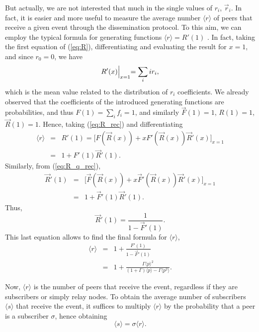 \documentclass[10pt, conference, compsocconf]{IEEEtran}
\begin{document}
But actually, we are not interested that much in the single values of $r_i$, $\overrightarrow{r}_i$. In fact, it is easier and more useful to measure the average number $\langle r \rangle$ of peers that receive a given event through the dissemination protocol. To this aim, we can employ the typical formula for generating functions
$\langle r \rangle = R'(1)$ \cite{Wilf_1994}.
In fact, taking the first equation of (\ref{eq:R}), differentiating and evaluating the result for $x=1$, and since $r_0 = 0$, we have 
$$R'(x) \Bigl\lvert_{x=1} = \sum_i i r_i,$$
which is the mean value related to the distribution of $r_i$ coefficients.
We already observed that the coefficients of the introduced generating functions are probabilities, and thus
$F(1)= \sum_i f_i = 1$, and similarly $\overrightarrow{F}(1)=1$, $R(1)=1$, $\overrightarrow{R}(1)=1$. Hence, taking (\ref{eq:R_rec}) and differentiating 
\begin{eqnarray}\label{eq:r} 
\langle r \rangle & =  & R'(1) = \big[F(\overrightarrow{R}(x)) + x F'(\overrightarrow{R}(x))\overrightarrow{R}'(x)\big]_{x=1}\nonumber \\
 &  = & 1 + F'(1)\overrightarrow{R}'(1).
\end{eqnarray}
Similarly, from (\ref{eq:R_q_rec}),
\begin{eqnarray}\label{eq:R_q_der} 
\overrightarrow{R}'(1) & = & \big[\overrightarrow{F}(\overrightarrow{R}(x)) + x \overrightarrow{F}'(\overrightarrow{R}(x))\overrightarrow{R}'(x)\big]_{x=1}\nonumber \\
 & = & 1 + \overrightarrow{F}'(1)\overrightarrow{R}'(1).
\end{eqnarray}
Thus,
\begin{equation}\label{eq:R_q_der_f}
\overrightarrow{R}'(1) = \frac{1}{1 - \overrightarrow{F}'(1)}.
\end{equation}
This last equation allows to find the final formula for $\langle r \rangle$,
\begin{eqnarray}\label{eq:r_final}
\langle r \rangle & = & 1 + \frac{F'(1)}{1 - \overrightarrow{F}'(1)}\nonumber \\ 
 &= & 1 + \frac{\Gamma\langle p \rangle^2}{(1+\Gamma)\langle p \rangle - \Gamma \langle p^2 \rangle}. 
\end{eqnarray}

Now, $\langle r \rangle$ is the number of peers that receive the event, regardless if they are subscribers or simply relay nodes. To obtain the average number of subscribers $\langle s \rangle$ that receive the event, it suffices to multiply $\langle r \rangle$ by the probability that a peer is a subscriber $\sigma$, hence obtaining
$$\langle s \rangle = \sigma \langle r \rangle.$$
\end{document}
